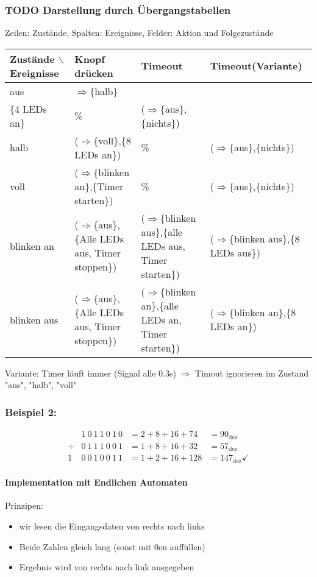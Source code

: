 \documentclass[a4paper]{scrartcl}
\begin{document}
\subsubsection{{\bfseries\sffamily TODO} Darstellung durch Übergangstabellen}
\label{sec-3-3-2}
Zeilen: Zustände, Spalten: Ereignisse, Felder: Aktion und Folgezustände
\begin{center}
\begin{tabular}{llll}
Zustände $\backslash$ Ereignisse & Knopf drücken & Timeout & Timeout(Variante)\\
\hline
aus & $\Rightarrow$\{halb\} \\ \{4 LEDs an\} & \% & ($\Rightarrow$\{aus\},\{nichts\})\\
halb & ($\Rightarrow$\{voll\},\{8 LEDs an\}) & \% & ($\Rightarrow$\{aus\},\{nichts\})\\
voll & ($\Rightarrow$\{blinken an\},\{Timer starten\}) & \% & ($\Rightarrow$\{aus\},\{nichts\})\\
blinken an & ($\Rightarrow$\{aus\},\{Alle LEDs aus, Timer stoppen\}) & ($\Rightarrow$\{blinken aus\},\{alle LEDs aus, Timer starten\}) & ($\Rightarrow$\{blinken aus\},\{8 LEDs aus\})\\
blinken aus & ($\Rightarrow$\{aus\},\{Alle LEDs aus, Timer stoppen\}) & ($\Rightarrow$\{blinken an\},\{alle LEDs an, Timer starten\}) & ($\Rightarrow$\{blinken an\},\{8 LEDs an\})\\
\end{tabular}
\end{center}

Variante: Timer läuft immer (Signal alle 0.3s) $\Rightarrow$ Timout ignorieren im Zustand "aus", "halb", "voll"
\subsubsection{Beispiel 2:}
\label{sec-3-3-3}
\begin{align}
&1~0~1~1~0~1~0 &= 2 + 8 + 16 + 74 &= 90_{\text{dez}} \\
+&0~1~1~1~0~0~1 &= 1 + 8 + 16 + 32 &= 57_{\text{dez}} \\
\hline
1~&0~0~1~0~0~1~1 &= 1 + 2 + 16 + 128 &= 147_{\text{dez}}\checkmark
\end{align}
\paragraph{Implementation mit Endlichen Automaten}
\label{sec-3-3-3-1}
Prinzipen:
\begin{itemize}
\item wir lesen die Eingangsdaten von rechts nach links
\item Beide Zahlen gleich lang (sonst mit 0en auffüllen)
\item Ergebnis wird von rechts nach link ausgegeben
\end{itemize}
\end{document}
